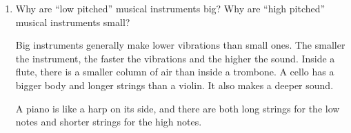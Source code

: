 \documentclass[12pt,noauthor,nooutcomes,hints,handout]{ximera}
\begin{document}
\begin{question}
\begin{enumerate}
\answerspace


\item Why are ``low pitched'' musical instruments big? Why are ``high pitched'' musical instruments small?

\answerlines



\begin{instructorNotes}

Big instruments generally make lower vibrations
than small ones. The smaller the
instrument, the faster the vibrations and
the higher the sound.
Inside a flute, there is a smaller
column of air than inside a trombone.
A cello has a bigger body and longer
strings than a violin. It also makes a
deeper sound.

A piano is like a harp on its side, and there are both long strings for the low notes and shorter strings for the high notes. 
\end{instructorNotes}
\end{enumerate}
\end{question}





\end{document}
